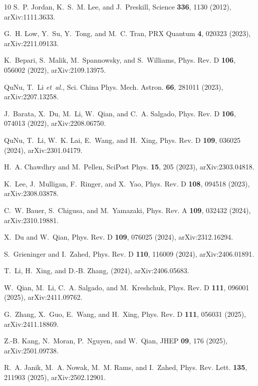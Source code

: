 \documentclass[aps,prd,twocolumn,superscriptaddress,notitlepage,nofootinbib,preprintnumbers]{revtex4-1}
\begin{document}
\begin{thebibliography}{10}
S.~P. Jordan, K.~S.~M. Lee, and J.~Preskill,
\newblock Science {\bf 336}, 1130 (2012), arXiv:1111.3633.

G.~H. Low, Y.~Su, Y.~Tong, and M.~C. Tran,
\newblock PRX Quantum {\bf 4}, 020323 (2023), arXiv:2211.09133.

K.~Bepari, S.~Malik, M.~Spannowsky, and S.~Williams,
\newblock Phys. Rev. D {\bf 106}, 056002 (2022), arXiv:2109.13975.

QuNu, T.~Li {\em et~al.},
\newblock Sci. China Phys. Mech. Astron. {\bf 66}, 281011 (2023),
  arXiv:2207.13258.

J.~Barata, X.~Du, M.~Li, W.~Qian, and C.~A. Salgado,
\newblock Phys. Rev. D {\bf 106}, 074013 (2022), arXiv:2208.06750.

QuNu, T.~Li, W.~K. Lai, E.~Wang, and H.~Xing,
\newblock Phys. Rev. D {\bf 109}, 036025 (2024), arXiv:2301.04179.

H.~A. Chawdhry and M.~Pellen,
\newblock SciPost Phys. {\bf 15}, 205 (2023), arXiv:2303.04818.

K.~Lee, J.~Mulligan, F.~Ringer, and X.~Yao,
\newblock Phys. Rev. D {\bf 108}, 094518 (2023), arXiv:2308.03878.

C.~W. Bauer, S.~Chigusa, and M.~Yamazaki,
\newblock Phys. Rev. A {\bf 109}, 032432 (2024), arXiv:2310.19881.

X.~Du and W.~Qian,
\newblock Phys. Rev. D {\bf 109}, 076025 (2024), arXiv:2312.16294.

S.~Grieninger and I.~Zahed,
\newblock Phys. Rev. D {\bf 110}, 116009 (2024), arXiv:2406.01891.

T.~Li, H.~Xing, and D.-B. Zhang,
\newblock (2024), arXiv:2406.05683.

W.~Qian, M.~Li, C.~A. Salgado, and M.~Kreshchuk,
\newblock Phys. Rev. D {\bf 111}, 096001 (2025), arXiv:2411.09762.

G.~Zhang, X.~Guo, E.~Wang, and H.~Xing,
\newblock Phys. Rev. D {\bf 111}, 056031 (2025), arXiv:2411.18869.

Z.-B. Kang, N.~Moran, P.~Nguyen, and W.~Qian,
\newblock JHEP {\bf 09}, 176 (2025), arXiv:2501.09738.

R.~A. Janik, M.~A. Nowak, M.~M. Rams, and I.~Zahed,
\newblock Phys. Rev. Lett. {\bf 135}, 211903 (2025), arXiv:2502.12901.


\end{thebibliography}
\end{document}
